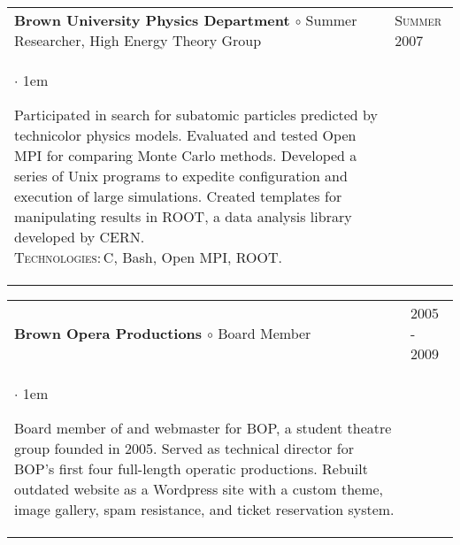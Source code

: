 \documentclass[10pt]{article}
\makeatletter
\newcommand{\employer}[4]
	{{ \begin{tabular}{l@{\hspace{5mm}}|p{30mm}}
	   \multicolumn{1}{l}{\textbf{#1 $\circ$ }#2}&\multicolumn{1}{p{30mm}}{\hspace{-3mm}\textsc{#3}} \\
	   \parbox{.825\textwidth}{#4 \vspace*{-4pt}}
	   \end{tabular} \vspace{4pt} }}
\newenvironment{achievements}           %
	{\begin{list}{$\cdot$}{\topsep 0pt \itemsep 4pt \parsep 0pt \leftmargin 1em}
	 \linespread{1.05} \selectfont %
	}
	{\end{list}\vspace*{4pt}}
\def\Cpp{{C\nolinebreak[4]\hspace{-.05em}\raisebox{.4ex}{\tiny\bf ++}}}
\def\kt{\vspace*{2pt}\\\textsc{Technologies:\,}}
\makeatother
\begin{document}
\employer{Brown University Physics Department}{Summer Researcher, High Energy Theory Group}{Summer 2007}{
	\begin{achievements}
	
	\item Participated in search for subatomic particles predicted by technicolor physics models. Evaluated and tested Open MPI for comparing Monte Carlo methods. Developed a series of Unix programs to expedite configuration and execution of large simulations. Created templates for manipulating results in ROOT, a data analysis library developed by CERN. \kt \Cpp, Bash, Open MPI, ROOT.
	
	\end{achievements}
}

\employer{Brown Opera Productions}{Board Member}{2005 - 2009}{
	\begin{achievements}
	
	\item Board member of and webmaster for BOP, a student theatre group founded in 2005. Served as technical director for BOP's first four full-length operatic productions. Rebuilt outdated website as a Wordpress site with a custom theme, image gallery, spam resistance, and ticket reservation system.
	
	\end{achievements}
}
\end{document}
